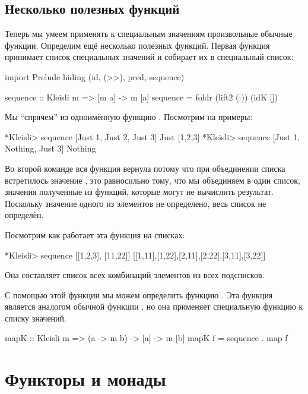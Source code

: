 \subsection{Несколько полезных функций}

Теперь мы умеем применять к специальным значениям произвольные обычные
функции. Определим ещё несколько полезных функций. Первая функция
принимает список специальных значений и собирает их в специальный
список:


\begin{code}
import Prelude hiding (id, (>>), pred, sequence)

sequence :: Kleisli m => [m a] -> m [a]
sequence = foldr (lift2 (:)) (idK []) 
\end{code}

Мы ``спрячем'' из  одноимённую функцию .
Посмотрим на примеры:


\begin{code}
*Kleisli> sequence [Just 1, Just 2, Just 3]
Just [1,2,3]
*Kleisli> sequence [Just 1, Nothing, Just 3]
Nothing
\end{code}

Во второй команде вся функция вернула  потому что при
объединении списка встретилось значение , это равносильно
тому, что мы объединяем в один список, значения полученные из функций,
которые могут не вычислить результат. Поскольку значение одного из
элементов не определено, весь список не определён.

Посмотрим как работает эта функция на списках:


\begin{code}
*Kleisli> sequence [[1,2,3], [11,22]]
[[1,11],[1,22],[2,11],[2,22],[3,11],[3,22]]
\end{code}

Она составляет список всех комбинаций элементов из всех подсписков.

С помощью этой функции мы можем определить функцию . Эта
функция является аналогом обычной функции , но она применяет
специальную функцию к списку значений.


\begin{code}
mapK :: Kleisli m => (a -> m b) -> [a] -> m [b]
mapK f = sequence . map f
\end{code}

\section{Функторы и монады}

